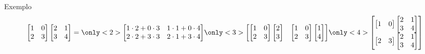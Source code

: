 \documentclass{beamer}
\begin{document}
\begin{darkframes}
\begin{frame}{Exemplo}
  \begin{equation*}
     \begin{bmatrix}
       1 & 0\\
       2 & 3
     \end{bmatrix}
     \begin{bmatrix}
       2 & 1\\
       3 & 4
     \end{bmatrix}
     = 
     \only<2>{\begin{bmatrix}
       1\cdot 2+0\cdot 3 & 1\cdot 1+0\cdot 4\\
       2\cdot 2+3\cdot 3 & 2\cdot 1+3\cdot 4
     \end{bmatrix}}
    \only<3>{%
    \begin{bmatrix}
      \begin{bmatrix}
        1 & 0\\
        2 & 3
      \end{bmatrix}
      \begin{bmatrix}
        2\\3
      \end{bmatrix}
      &
      \begin{bmatrix}
        1 & 0\\
        2 & 3
      \end{bmatrix}
      \begin{bmatrix}
        1\\4
      \end{bmatrix}
    \end{bmatrix}}
    \only<4>{%
    \begin{bmatrix}
      \begin{bmatrix}
        1 & 0
      \end{bmatrix}
      \begin{bmatrix}
        2 & 1\\
        3 & 4
      \end{bmatrix}\\
      \begin{bmatrix}
        2 & 3
      \end{bmatrix}
      \begin{bmatrix}
        2 & 1\\
        3 & 4
      \end{bmatrix}
    \end{bmatrix}}
  \end{equation*}
\end{frame}


\end{darkframes}
\end{document}
